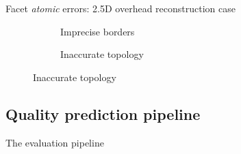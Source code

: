 \documentclass[10pt, export]{beamer}
\begin{document}
\begin{frame}{Facet \textit{atomic} errors: 2.5D overhead reconstruction case}
\begin{figure}
\begin{center}
\begin{subfigure}{.33\textwidth}
                        \caption{\label{fig::fac_footprint} Imprecise borders}
                    \end{subfigure}
                    \begin{subfigure}{.33\textwidth}
                        \caption{\label{fig::fac_height} Inaccurate topology}
                    \end{subfigure}
                \end{center}
            \end{figure}
        \end{frame}
        \subsection{Quality prediction pipeline}
            \begin{frame}{The evaluation pipeline}
                \begin{figure}
                    
                \end{figure}
            \end{frame}
\end{document}
